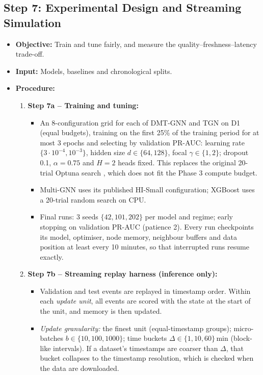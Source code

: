 \documentclass[11pt,a4paper]{article}
\begin{document}
\subsection{Step 7: Experimental Design and Streaming Simulation}
\begin{itemize}[leftmargin=*]
    \item \textbf{Objective:} Train and tune fairly, and measure the quality--freshness--latency trade-off.
    \item \textbf{Input:} Models, baselines and chronological splits.
    \item \textbf{Procedure:}
    \begin{enumerate}[leftmargin=*]
        \item \textbf{Step 7a -- Training and tuning:}
        \begin{itemize}
            \item An 8-configuration grid for each of DMT-GNN and TGN on D1 (equal budgets), training on the first 25\% of the training period for at most 3 epochs and selecting by validation PR-AUC: learning rate $\{3\cdot10^{-4}, 10^{-3}\}$, hidden size $d\in\{64,128\}$, focal $\gamma\in\{1,2\}$; dropout 0.1, $\alpha=0.75$ and $H=2$ heads fixed. This replaces the original 20-trial Optuna search \cite{akiba2019optuna}, which does not fit the Phase 3 compute budget.
            \item Multi-GNN uses its published HI-Small configuration; XGBoost uses a 20-trial random search on CPU.
            \item Final runs: 3 seeds $\{42, 101, 202\}$ per model and regime; early stopping on validation PR-AUC (patience 2). Every run checkpoints its model, optimiser, node memory, neighbour buffers and data position at least every 10 minutes, so that interrupted runs resume exactly.
        \end{itemize}
        \item \textbf{Step 7b -- Streaming replay harness (inference only):}
        \begin{itemize}
            \item Validation and test events are replayed in timestamp order. Within each \emph{update unit}, all events are scored with the state at the start of the unit, and memory is then updated.
            \item \textit{Update granularity:} the finest unit (equal-timestamp groups); micro-batches $b\in\{10, 100, 1000\}$; time buckets $\Delta\in\{1, 10, 60\}$\,min (block-like intervals). If a dataset's timestamps are coarser than $\Delta$, that bucket collapses to the timestamp resolution, which is checked when the data are downloaded.

\end{itemize}
\end{enumerate}
\end{itemize}
\end{document}
